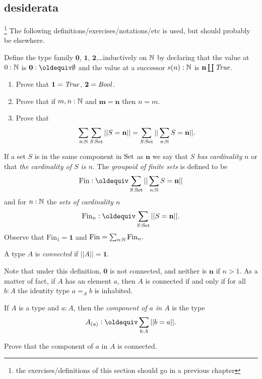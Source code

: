\label{ch:groups}
\newcommand{\base}{\bullet}%
\newcommand{\Sloop}{\mathit{loop}}%
\newcommand{\Eq}{\mathrm{Eq}}%
\newcommand{\idtoeq}{\mathrm{id2eq}}%
\newcommand{\ua}{\mathrm{ua}}%

\subsection{desiderata}\footnote{the exercises/definitions of this section should go in a previous chapter}
The following definitions/exercises/notations/etc is used, but should probably be elsewhere.

\newcommand{\fin}{\mathrm{Fin}}
\begin{definition}\label{def:finiteset}
   Define the type family $\mathbf 0$, $\mathbf 1$, $\mathbf 2$,\dots inductively on $\mathbb{N}$ by declaring that the value at $0:\mathbb{N}$ is $\mathbf 0\defequi\emptyset$ and the value at a successor $s(n):\mathbb{N}$ is $\mathbf n\coprod\mathop{\mathit{True}}$.  
  \begin{enumerate}
  \item Prove that $\mathbf 1=\mathop{\mathit{True}}$, $\mathbf 2=\mathop{\mathit{Bool}}$. 
  \item Prove that if $m,n:\mathbb{N}$ and $\mathbf m=\mathbf n$ then $n=m$.  
  \item   Prove that
$$\sum_{n:\mathbb{N}}\sum_{S:\mathord{\mathrm{Set}}}||S=\mathbf n|| =\sum_{S:\mathord{\mathrm{Set}}}||\sum_{n:\mathbb{N}}S=\mathbf n||.
$$
  \end{enumerate}
If a set $S$ is in the same component in $\mathord{\mathrm{Set}}$ as $\mathbf n$ we say that \emph{$S$ has cardinality $n$} or that \emph{the cardinality of $S$ is $n$}.
The \emph{groupoid of finite sets} is defined to be
$$\fin\defequi\sum_{S:\Set}||\sum_{n:\NN}S=\mathbf n||$$
and for $n:\mathbb{N}$ the \emph{sets of cardinality $n$}
$$\fin_n\defequi \sum_{S:\Set}||S=\mathbf n||.$$
Observe that $\fin_1=\mathbf 1$ and $\fin=\sum_{n:\NN}\fin_n.$

\begin{definition}\label{def:connected}
A type $A$ is \emph{connected} if $||A||%
=\mathbf 1$.  
\end{definition}
Note that under this definition, $\mathbf 0$ is not connected, and neither is $\mathbf n$ if $n>1$.  As a matter of fact, if $A$ has an element $a$, then $A$ is connected if and only if for all $b:A$ the identity type $a=_Ab$ is inhabited.
\begin{definition}
    If $A$ is a type and $a:A$, then the \emph{component of $a$ in $A$} is the type
$$A_{(a)}\defequi \sum_{b:A}||b=a||.$$
\end{definition}
\begin{xca}
  Prove that the component of $a$ in $A$ is connected.  


\end{xca}
\end{definition}
